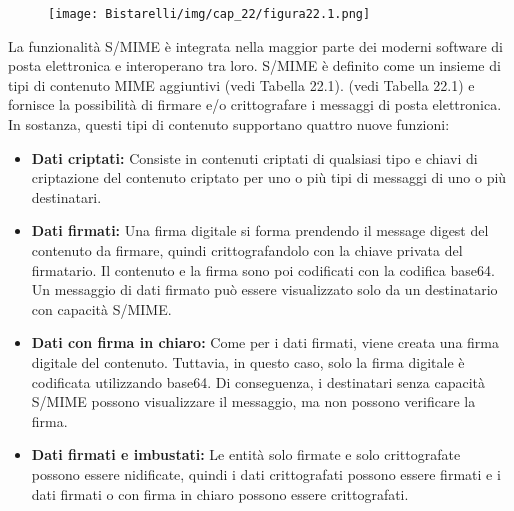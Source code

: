 \begin{figure}[H]
	\centering
    \texttt{[image: Bistarelli/img/cap\_22/figura22.1.png]}
\end{figure}

La funzionalità S/MIME è integrata nella maggior parte dei moderni software di posta elettronica e interoperano tra loro. S/MIME è definito come un insieme di tipi di contenuto MIME aggiuntivi (vedi Tabella 22.1).
(vedi Tabella 22.1) e fornisce la possibilità di firmare e/o crittografare i messaggi di posta elettronica. In sostanza, questi tipi di contenuto supportano quattro nuove funzioni:
\begin{itemize}
    \item \textbf{Dati criptati:} Consiste in contenuti criptati di qualsiasi tipo e chiavi di criptazione del contenuto criptato per uno o più tipi di messaggi di uno o più destinatari.
    
    \item \textbf{Dati firmati:} Una firma digitale si forma prendendo il message digest del contenuto da firmare, quindi crittografandolo con la chiave privata del firmatario. Il contenuto e la firma sono poi codificati con la codifica base64. Un messaggio di dati firmato può essere visualizzato solo da un destinatario con capacità S/MIME.
    
    \item \textbf{Dati con firma in chiaro:} Come per i dati firmati, viene creata una firma digitale del contenuto. Tuttavia, in questo caso, solo la firma digitale è codificata utilizzando base64. Di conseguenza, i destinatari senza capacità S/MIME possono visualizzare il messaggio, ma non possono verificare la firma.
    
    \item \textbf{Dati firmati e imbustati:} Le entità solo firmate e solo crittografate possono essere nidificate, quindi i dati crittografati possono essere firmati e i dati firmati o con firma in chiaro possono essere crittografati.
\end{itemize}
